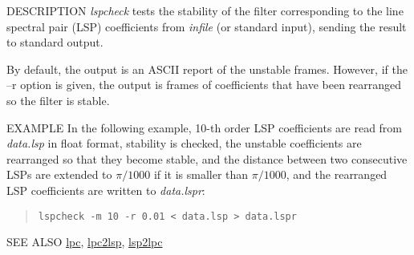 \begin{synopsis}
\item [lspcheck] [ --m $M$ ] [ --s $S$ ] [ --k ] [ --i $I$ ] [ --o $O$ ]
		[ --r $R$] [ {\em infile} ] 
\end{synopsis}

\begin{qsection}{DESCRIPTION}
{\em lspcheck} tests the stability of the filter 
corresponding to the line spectral pair (LSP) coefficients 
from {\em infile} (or standard input), 
sending the result to standard output.

By default, the output is an ASCII report of the unstable frames.
However, if the --r option is given, 
the output is frames of coefficients 
that have been rearranged so the filter is stable.
\end{qsection}

\begin{options}
\end{options}

\begin{qsection}{EXAMPLE}
In the following example, 10-th order LSP coefficients are
read from {\em data.lsp} in float format,
stability is checked, the unstable coefficients are rearranged
so that they become stable, and the distance between two
consecutive LSPs are extended to $\pi /1000$ if
 it is smaller than $\pi /1000$, and the
 rearranged LSP coefficients are written to {\em data.lspr}:
\begin{quote}
\verb!lspcheck -m 10 -r 0.01 < data.lsp > data.lspr!
\end{quote}
\end{qsection}

\begin{qsection}{SEE ALSO}
\hyperlink{lpc}{lpc},
\hyperlink{lpc2lsp}{lpc2lsp},
\hyperlink{lsp2lpc}{lsp2lpc}
\end{qsection}
